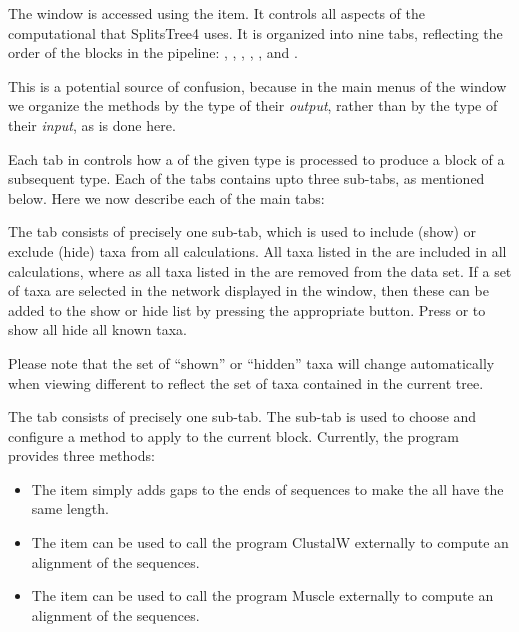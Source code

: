 \documentclass[11pt]{article}
\def\SplitsTree{{\sf SplitsTree4 }}
\begin{document}

The  window  is accessed using the
 item.
It controls all aspects of the
computational  that \SplitsTree uses.
It is organized into nine tabs, reflecting the order of the blocks
in the pipeline:
, ,
,
, ,
 and .

This is a  potential source of confusion, because
in the main menus of the  window we organize the methods
by the type of their {\em output}, rather than by
the type of their {\em input}, as is done here.

Each tab in controls how a  of the given type
is processed to produce a block of a subsequent type.
Each of the tabs contains upto three sub-tabs, as mentioned
below. Here we now describe each of the main tabs:


The  tab consists of precisely one
 sub-tab, which is used to
include (show) or exclude (hide) taxa from all calculations.
All taxa listed in the  are included in all calculations,
where as all taxa listed in the  are removed from
the data set. If a set of taxa are selected in the network displayed
in the  window, then these can be added to the
show or hide list by pressing the appropriate  button.
Press  or  to show all hide all known
taxa.

Please note that the set of ``shown'' or ``hidden'' taxa will change
automatically when viewing different  to reflect the
set of taxa contained in the current tree.


The  tab consists of precisely one sub-tab.
The  sub-tab is used to
choose and configure a method
to apply to the current  block.
Currently, the program provides three methods:
\begin{itemize}
\item The  item simply adds gaps to the ends of sequences
to make the all have the same length.
\item The  item can be used to call the program
ClustalW externally
to compute an alignment of the sequences.
\item The  item can be used to call the program
Muscle externally
to compute an alignment of the sequences.
\end{itemize}
\end{document}
